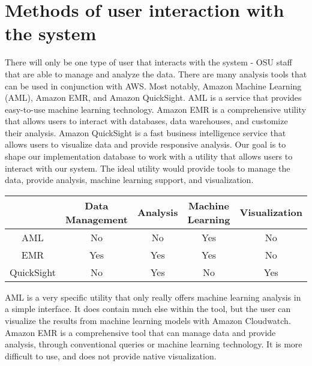 \section{Methods of user interaction with the system}
        There will only be one type of user that interacts with the system - OSU staff that are able to manage and analyze the data. There are many analysis tools that can be used in conjunction with AWS. Most notably, Amazon Machine Learning (AML), Amazon EMR, and Amazon QuickSight. AML is a service that provides easy-to-use machine learning technology. Amazon EMR is a comprehensive utility that allows users to interact with databases, data warehouses, and customize their analysis. Amazon QuickSight is a fast business intelligence service that allows users to visualize data and provide responsive analysis. Our goal is to shape our implementation database to work with a utility that allows users to interact with our system. The ideal utility would provide tools to manage the data, provide analysis, machine learning support, and visualization.

        \begin{table}[ht]
        \centering
        \begin{tabular}{|c|c|c|c|c|}
            \hline
            \textbf{} & \textbf{Data Management} & \textbf{Analysis} & \textbf{Machine Learning} & \textbf{Visualization}\\
            \hline
            AML & No & No & Yes & No\\
            \hline
            EMR & Yes & Yes & Yes & No\\
            \hline
            QuickSight & No & Yes & No & Yes\\
            \hline
        \end{tabular}
        \end{table}

        \noindent AML is a very specific utility that only really offers machine learning analysis in a simple interface. It does contain much else within the tool, but the user can visualize the results from machine learning models with Amazon Cloudwatch.\\ 
        
        \noindent Amazon EMR is a comprehensive tool that can manage data and provide analysis, through conventional queries or machine learning technology. It is more difficult to use, and does not provide native visualization.\\ 

